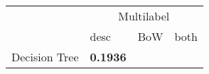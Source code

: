 \begin{tabular}{|l|l|l|l| }
\hline
 &  \multicolumn{3}{c|}{Multilabel} \\
\cline{2-4} & desc & BoW & both \\ \hline
Decision Tree & {\bf 0.1936}\\
\hline
\end{tabular}